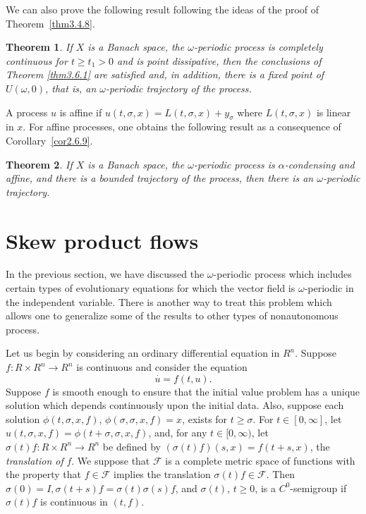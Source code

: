 \documentclass{surv-l}
\theoremstyle{plain}
\newtheorem{theorem}{Theorem}[section]
\theoremstyle{definition}
\numberwithin{equation}{section}
\numberwithin{figure}{chapter}
\begin{document}
We can also prove the following result following the ideas of the proof of Theorem~\ref{thm3.4.8}.

\begin{theorem}\label{thm3.6.3} If $X$ is a Banach space, the $\omega$-periodic process is completely continuous for $t\geq t_{1}>0$ and is point dissipative, then the conclusions of Theorem \ref{thm3.6.1} are satisfied and, in addition, there is a fixed point of $U(\omega,0)$, that is, an $\omega$-periodic trajectory of the process.
\end{theorem}

A process $u$ is affine if $u(t,\sigma, x)=L(t,\sigma,x)+y_{\sigma}$ where $L(t,\sigma,x)$ is linear in $x$. For affine processes, one obtains the following result as a consequence of Corollary~\ref{cor2.6.9}.

\begin{theorem}\label{thm3.6.4} If $X$ is a Banach space, the $\omega$-periodic process is $\alpha$-condensing and affine, and there is a bounded trajectory of the process, then there is an $\omega$-periodic trajectory.
\end{theorem}

\section{Skew product flows}\label{sec3.7}

In the previous section, we have discussed the $\omega$-periodic process which includes certain types of evolutionary equations for which the vector field is $\omega$-periodic in the independent variable. There is another way to treat this problem which allows one to generalize some of the results to other types of nonautonomous process.

Let us begin by considering an ordinary differential equation in $R^{n}$. Suppose $f\!:R\times R^{n}\rightarrow R^{n}$ is continuous and consider the equation
\begin{equation}\label{eq7.1}
{\overset{\cdot}{u}}=f(t,u).
\end{equation}
Suppose $f$ is smooth enough to ensure that the initial value problem has a unique solution which depends continuously upon the initial data. Also, suppose each solution $\phi(t,\sigma,x, f)$, $\phi(\sigma,\sigma,x, f)=x$, exists for $ t\geq\sigma$. For $t\in[0,\infty]$, let $u(t,\sigma,x,f)=\phi(t+\sigma, \sigma,x,f)$, and, for any $t\in[0,\infty)$, let $\sigma(t)f\!:R\times R^{n}\rightarrow R^{n}$ be defined by $(\sigma(t)f)(s,x)=f(t+s,x)$, the \emph{translation of} $f$. We suppose that $\mathcal{F}$ is a complete metric space of functions with the property that $f\in \mathcal{F}$ implies the translation $\sigma(t)f\in \mathcal{F}$. Then $\sigma(0)=I,\sigma(t+s)f=\sigma(t)\sigma(s) f$, and $\sigma(t)$, $t\geq 0$, is a $C^{0}$-semigroup if $\sigma(t)f$ is continuous in $(t,f)$.
\end{document}

